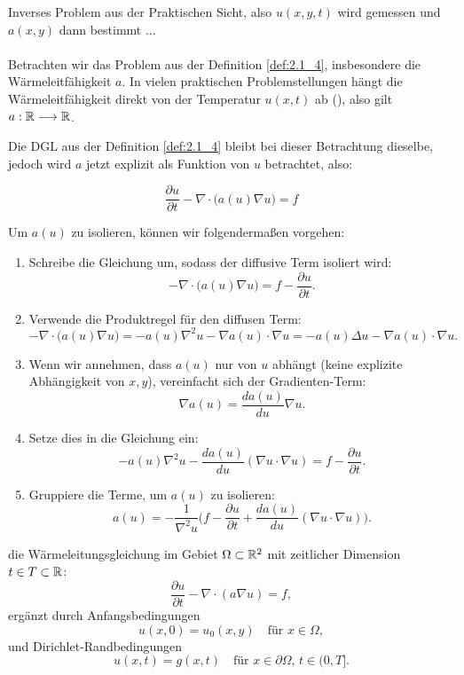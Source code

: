 {\color{red}Inverses Problem aus der Praktischen Sicht, also $u(x,y,t)$ wird gemessen und $a(x,y)$ dann bestimmt ...} \\\\


Betrachten wir das Problem aus der Definition \ref{def:2.1_4}, insbesondere die Wärmeleitfähigkeit $a$. In vielen praktischen Problemstellungen hängt die Wärmeleitfähigkeit direkt von der Temperatur $u(x,t)$ ab (\cite[S. 506]{Handrock-Meyer88}), also gilt $a:\mathbb{R} \longrightarrow \mathbb{R}$.

Die DGL aus der Definition \ref{def:2.1_4} bleibt bei dieser Betrachtung dieselbe, jedoch wird $a$ jetzt explizit als Funktion von $u$ betrachtet, also:

\begin{equation}
	\frac{\partial u}{\partial t} - \nabla \cdot \big(a(u) \nabla u\big) = f
	\label{equa:2.1_11}
\end{equation}

Um $a(u)$ zu isolieren, können wir folgendermaßen vorgehen:
\begin{enumerate}
	\item Schreibe die Gleichung um, sodass der diffusive Term isoliert wird:
	\[
	-\nabla \cdot \big(a(u) \nabla u\big) = f - \frac{\partial u}{\partial t}.
	\]
	
	\item Verwende die Produktregel für den diffusen Term:
	\[
	-\nabla \cdot \big(a(u) \nabla u\big) = -a(u) \nabla^2 u - \nabla a(u) \cdot \nabla u = -a(u) \Delta u - \nabla a(u) \cdot \nabla u.
	\]
	
	\item Wenn wir annehmen, dass $a(u)$ nur von $u$ abhängt (keine explizite Abhängigkeit von $x, y$), vereinfacht sich der Gradienten-Term:
	\[
	\nabla a(u) = \frac{da(u)}{du} \nabla u.
	\]
	
	\item Setze dies in die Gleichung ein:
	\[
	-a(u) \nabla^2 u - \frac{da(u)}{du} (\nabla u \cdot \nabla u) = f - \frac{\partial u}{\partial t}.
	\]
	
	\item Gruppiere die Terme, um $a(u)$ zu isolieren:
	\[
	a(u) = -\frac{1}{\nabla^2 u}\Big(f - \frac{\partial u}{\partial t} + \frac{da(u)}{du} (\nabla u \cdot \nabla u)\Big).
	\]
\end{enumerate}


die Wärmeleitungsgleichung im Gebiet $\Omega \subset \mathbb{R}^2$ mit zeitlicher Dimension $t \in T \subset \mathbb{R}$:
\[
\frac{\partial u}{\partial t} - \nabla \cdot (a \nabla u) = f,
\]
ergänzt durch Anfangsbedingungen
\[
u(x,0) = u_0(x,y) \quad \text{für } x \in \Omega,
\]
und Dirichlet-Randbedingungen
\[
u(x,t) = g(x,t) \quad \text{für } x \in \partial \Omega, \, t \in (0,T].
\]

